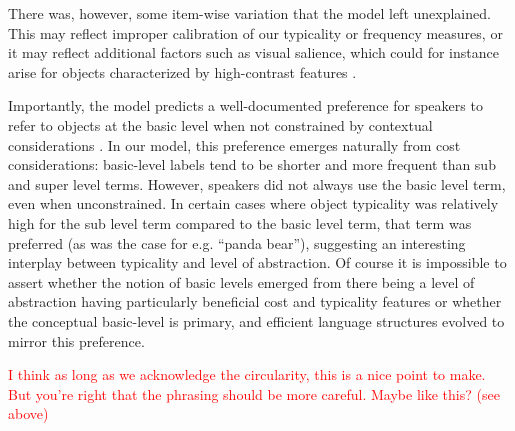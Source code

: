 \documentclass[10pt,letterpaper]{article}
\newcommand{\jd}[1]{\textcolor{Blue}{[jd: #1]}}
\newcommand{\caroline}[1]{\textcolor{Red}{#1}}
\begin{document}
There was, however, some item-wise variation that the model left unexplained. This may reflect improper calibration of our typicality or frequency measures, or it may reflect additional factors such as visual salience, which could for instance arise for objects characterized by high-contrast features \cite{Westerbeek2015}.

Importantly, the model predicts a well-documented preference for speakers  to refer to objects at the basic level when not constrained by contextual considerations  \cite{RoschEtAl76_BasicLevel}. In our model, this preference emerges naturally from cost considerations: basic-level labels tend to be shorter and more frequent than sub and super level terms. However, speakers did not always use the basic level term, even when unconstrained. In certain cases where object typicality was relatively high for the sub level term compared to the basic level term, that term was preferred (as was the case for e.g. ``panda bear''), suggesting an interesting interplay between typicality and level of abstraction. %
Of course it is impossible to assert whether the notion of basic levels emerged from there being a level of abstraction having particularly beneficial cost and typicality features or whether the conceptual basic-level is primary, and efficient language structures evolved to mirror this preference.

\caroline{I think as long as we acknowledge the circularity, this is a nice point to make. But you're right that the phrasing should be more careful. Maybe like this? (see above)}

\end{document}
